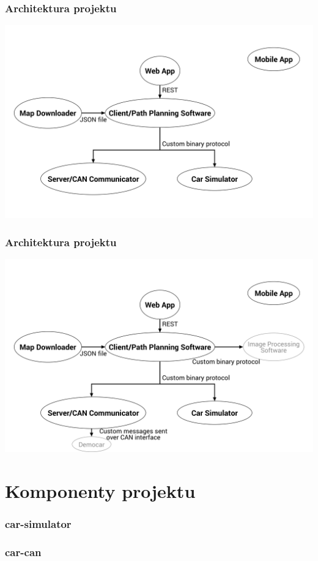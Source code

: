 \documentclass{beamer}
\begin{document}
\begin{frame}
    \frametitle{Architektura projektu}
    \begin{center}
        \includegraphics[width=0.9\columnwidth]{car-schema}
    \end{center}
\end{frame}

\begin{frame}
    \frametitle{Architektura projektu}
    \begin{center}
        \includegraphics[width=0.9\columnwidth]{car-schema-full}
    \end{center}
\end{frame}

\section{Komponenty projektu}

\begin{frame}
    \frametitle{car-simulator}
\end{frame}

\begin{frame}
    \frametitle{car-can}
\end{frame}
\end{document}

